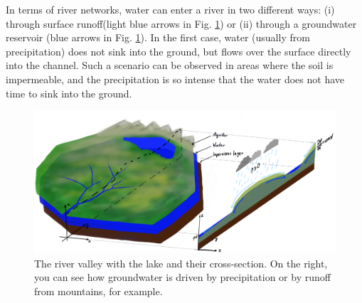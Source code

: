 \documentclass[]{pracamgr}
\begin{document}
    In terms of river networks, water can enter a river in two different ways: (i) through surface runoff(light blue arrows in Fig. \ref{pow_wsiakanie}) or (ii) through a groundwater reservoir (blue arrows in Fig. \ref{pow_wsiakanie}). In the first case, water (usually from precipitation) does not sink into the ground, but flows over the surface directly into the channel. Such a scenario can be observed in areas where the soil is impermeable, and the precipitation is so intense that the water does not have time to sink into the ground.

    \begin{figure}[H]
      \centering
      \includegraphics[width=1\textwidth]{figs/basic_river_illustration.png}
      \caption{The river valley with the lake and their cross-section. On the right, you can see how groundwater is driven by precipitation or by runoff from mountains, for example.}
      \label{pow_wsiakanie}
    \end{figure}
\end{document}
